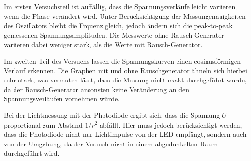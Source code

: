 Im ersten Versuchsteil ist auffällig, dass die Spannungsverläufe leicht variieren,
wenn die Phase verändert wird. Unter Berücksichtigung der Messungenauigkeiten des Oszillators
bleibt die Frquenz gleich, jedoch ändern sich die peak-to-peak gemessenen Spannungsamplituden.
Die Messwerte ohne Rausch-Generator variieren dabei weniger stark, als die Werte
mit Rausch-Generator.

Im zweiten Teil des Versuchs lassen die Spannungskurven einen cosinusförmigen Verlauf erkennen.
Die Graphen mit und ohne Rauschgenerator ähneln sich hierbei sehr stark, was vermuten lässt,
dass die Messung nicht exakt durchgeführt wurde, da der Rausch-Generator ansonsten keine Veränderung an
den Spannungsverläufen vornehmen würde.

Bei der Lichtmessung mit der Photodiode ergibt sich, dass die Spannung $U$
proportional zum Abstand $1/r^2$ abfällt. Hier muss jedoch berücksichtigt werden, dass
die Photodiode nicht nur Lichtimpulse von der LED empfängt, sondern auch von der
Umgebung, da der Versuch nicht in einem abgedunkelten Raum durchgeführt wird. 
